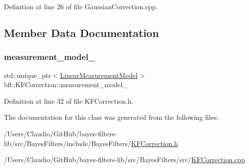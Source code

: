 Definition at line 26 of file Gaussian\+Correction.\+cpp.



\subsection{Member Data Documentation}
\mbox{\label{classbfl_1_1KFCorrection_a4e6d053bf4a6fb2270b34c7c866b4347}} 
\subsubsection{\texorpdfstring{measurement\+\_\+model\+\_\+}{measurement\_model\_}}
{\footnotesize\ttfamily std\+::unique\+\_\+ptr$<$\mbox{\hyperlink{classbfl_1_1LinearMeasurementModel}{Linear\+Measurement\+Model}}$>$ bfl\+::\+K\+F\+Correction\+::measurement\+\_\+model\+\_\+\hspace{0.3cm}{\ttfamily [private]}}



Definition at line 32 of file K\+F\+Correction.\+h.



The documentation for this class was generated from the following files\+:\begin{DoxyCompactItemize}
\item 
/\+Users/\+Claudio/\+Git\+Hub/bayes-\/filters-\/lib/src/\+Bayes\+Filters/include/\+Bayes\+Filters/\mbox{\hyperlink{KFCorrection_8h}{K\+F\+Correction.\+h}}\item 
/\+Users/\+Claudio/\+Git\+Hub/bayes-\/filters-\/lib/src/\+Bayes\+Filters/src/\mbox{\hyperlink{KFCorrection_8cpp}{K\+F\+Correction.\+cpp}}\end{DoxyCompactItemize}
